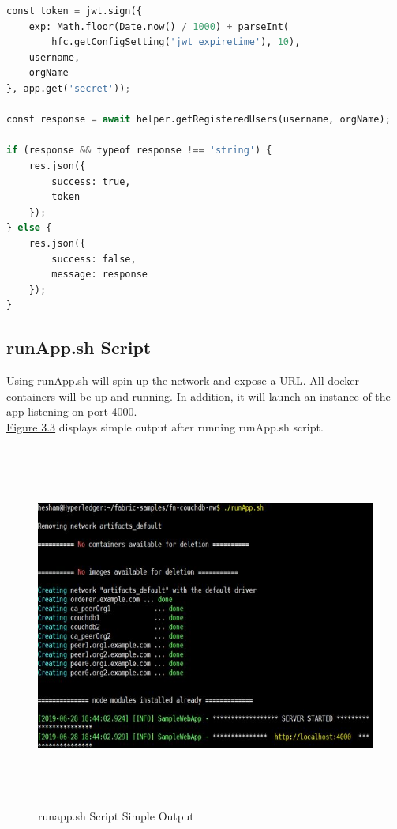 \begin{lstlisting}[language=Python, caption=JWT Generation]
const token = jwt.sign({
    exp: Math.floor(Date.now() / 1000) + parseInt(
        hfc.getConfigSetting('jwt_expiretime'), 10),
    username,
    orgName
}, app.get('secret'));

const response = await helper.getRegisteredUsers(username, orgName);

if (response && typeof response !== 'string') {
    res.json({
        success: true,
        token
    });
} else {
    res.json({
        success: false,
        message: response
    });
}
\end{lstlisting}
\cleardoublepage


\subsection{runApp.sh Script }
Using runApp.sh will spin up the network and expose a URL. All docker containers will be up and running. In addition, it will launch an instance of the app listening on port 4000. \\
\hyperref[fig:runapp]{Figure 3.3} displays simple output after running runApp.sh script. 
\ \\
 \begin{figure}[H]
\includegraphics[width=15cm,height=12cm]{images/runapp.jpg}
\caption{runapp.sh Script Simple Output}
\label{fig:runapp}
\end{figure}


